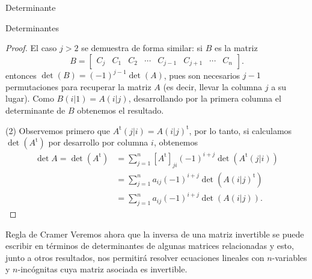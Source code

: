 \documentclass[a4paper,12pt,twoside,spanish]{amsbook}
\theoremstyle{definition}
\theoremstyle{remark}
\renewcommand{\t}{{\operatorname{t}}}
\begin{document}
\begin{chapter}{Determinante}
\begin{section}{Determinantes}
\begin{proof}
		 	El caso $j>2$  se demuestra de forma similar: si $B$ es la matriz
		 	$$
		 	B = \begin{bmatrix} C_j &C_1 &C_2 &\cdots& C_{j-1}&C_{j+1}&\cdots &C_n\end{bmatrix}.
		 	$$        
		 	entonces $\det(B)=(-1)^{j-1}\det(A)$, pues son necesarios $j-1$ permutaciones para recuperar la matriz $A$ (es decir, llevar la columna $j$ a su lugar).
		 	Como $B(i|1) = A(i|j)$,  desarrollando por la primera columna el determinante de $B$ obtenemos el resultado.  
		 	
		 	
		 	(2) Observemos primero que $A^\t(j|i) = A(i|j)^\t$, por lo tanto, si calculamos $\det(A^\t)$ por desarrollo por columna $i$, obtenemos 
		 	\begin{align*}
		 	\det A = \det(A^\t)&=\sum_{j=1}^{n} [A^\t]_{ji} (-1)^{i+j}\det (A^\t(j|i)) \\
		 	&=  \sum_{j=1}^{n} a_{ij} (-1)^{i+j}\det (A(i|j)^\t) \\
		 	&= \sum_{j=1}^{n} a_{ij} (-1)^{i+j}\det (A(i|j)).
		 	\end{align*}
		 	
		 	
		 \end{proof}
		 
		 
		\end{section}
	
		 
		 
		 \begin{section}{Regla de Cramer} Veremos ahora que la inversa de una matriz invertible se puede escribir en términos de determinantes de algunas matrices relacionadas y esto, junto a otros resultados, nos permitirá resolver ecuaciones lineales con $n$-variables y $n$-incógnitas cuya matriz asociada es invertible.  
		 	

\end{section}
\end{chapter}
\end{document}

